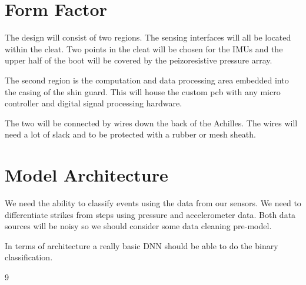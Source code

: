\documentclass[11pt]{article}
\begin{document}
\section{Form Factor}
The design will consist of two regions. The sensing interfaces will all be located within the cleat. Two points in the cleat will be chosen for the IMUs and the upper half of the boot will be covered by the peizoresistive pressure array.

The second region is the computation and data processing area embedded into the casing of the shin guard. This will house the custom pcb with any micro controller and digital signal processing hardware.

The two will be connected by wires down the back of the Achilles. The wires will need a lot of slack and to be protected with a rubber or mesh sheath.

\section{Model Architecture}
We need the ability to classify events using the data from our sensors. We need to differentiate strikes from steps using pressure and accelerometer data. Both data sources will be noisy so we should consider some data cleaning pre-model.

In terms of architecture a really basic DNN should be able to do the binary classification.

\begin{thebibliography}{9}
\small

\end{thebibliography}
\end{document}
